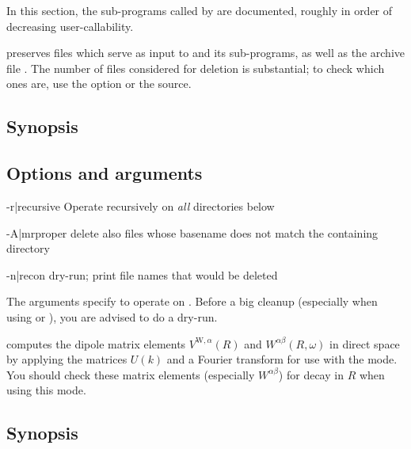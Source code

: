 In this section, the sub-programs called by \woprog are documented,
roughly in order of decreasing user-callability.



\wopticlean preserves files which serve as input to \woprog and its
sub-programs, as well as the archive file \wophist.  The number of
files considered for deletion is substantial; to check which ones are,
use the  option or the source.

\subsection{Synopsis}

\begin{usage}
\end{usage}

\subsection{Options and arguments}

\begin{options}
\item [-r|\td recursive] Operate recursively on \emph{all} directories
  below
\item [-A|\td mrproper] delete also files whose basename does not
  match the containing directory
\item [-n|\td recon] dry-run; print file names that would be deleted
\end{options}
%
The arguments specify  to operate on
.  Before a big cleanup (especially when
using  or ), you are advised to do a dry-run.



\compvr computes the dipole matrix elements $V^{\text{W},α}(R)$ and
$W^{αβ}(R, ω)$ in direct space by applying the matrices $U(k)$ and a
Fourier transform for use with the  mode.  You should
check these matrix elements (especially $W^{αβ}$) for decay in $R$
when using this mode.

\subsection{Synopsis}
\begin{usage}
  \compvr [\td text] \case
\end{usage}

